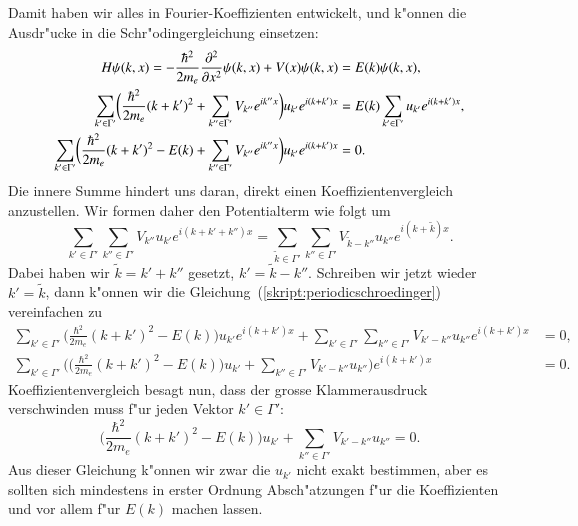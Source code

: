 Damit haben wir alles in Fourier-Koeffizienten entwickelt, und k"onnen die
Ausdr"ucke in die Schr"odingergleichung einsetzen:
\begin{align}
H\psi(k,x)
=
-\frac{\hbar^2}{2m_e}\frac{\partial^2}{\partial x^2} \psi(k,x)
+V(x)\psi(k,x)
&=E(k)\psi(k,x),
\notag
\\
\sum_{k'\in\Gamma'}\biggl(
\frac{\hbar^2}{2m_e}(k+k')^2
+
\sum_{k''\in\Gamma'}V_{k''}e^{ik''x}
\biggr)u_{k'}e^{i(k+k')x}
&=
E(k)\sum_{k'\in\Gamma'} u_{k'}e^{i(k+k')x},
\notag
\\
\sum_{k'\in\Gamma'}\biggl(
\frac{\hbar^2}{2m_e}(k+k')^2
-E(k)
+
\sum_{k''\in\Gamma'}V_{k''}e^{ik''x}
\biggr)u_{k'}e^{i(k+k')x}
&=
0.
\label{skript:periodicschroedinger}
\end{align}
Die innere Summe hindert uns daran, direkt einen Koeffizientenvergleich
anzustellen.
Wir formen daher den Potentialterm wie folgt um
\begin{equation*}
\sum_{k'\in\Gamma'}
\sum_{k''\in\Gamma'}V_{k''}u_{k'}e^{i(k+k'+k'')x}
=
\sum_{\tilde k\in\Gamma'}
\sum_{k''\in\Gamma'}V_{\tilde k-k''}u_{k''}e^{i(k+\tilde k)x}.
\end{equation*}
Dabei haben wir $\tilde k=k'+k''$ gesetzt, $k'=\tilde k-k''$.
Schreiben wir jetzt wieder $k'=\tilde k$, dann k"onnen wir die
Gleichung~(\ref{skript:periodicschroedinger}) vereinfachen zu
\begin{align*}
\sum_{k'\in\Gamma'}\biggl(
\frac{\hbar^2}{2m_e}(k+k')^2
-E(k)
\biggr)u_{k'}e^{i(k+k')x}
+
\sum_{k'\in\Gamma'}\sum_{k''\in\Gamma'}V_{k'-k''}u_{k''}e^{i(k+k')x}
&=
0,
\\
\sum_{k'\in\Gamma'}\biggl(
\biggl(
\frac{\hbar^2}{2m_e}(k+k')^2
-E(k)
\biggr)u_{k'}
+
\sum_{k''\in\Gamma'}V_{k'-k''}u_{k''}
\biggl)
e^{i(k+k')x}
&=
0.
\end{align*}
Koeffizientenvergleich besagt nun, dass der grosse Klammerausdruck
verschwinden muss f"ur jeden Vektor $k'\in\Gamma'$:
\begin{equation}
\biggl(
\frac{\hbar^2}{2m_e}(k+k')^2
-E(k)
\biggr)u_{k'}
+
\sum_{k''\in\Gamma'}V_{k'-k''}u_{k''}
=
0.
\label{skript:ukgleichung}
\end{equation}
Aus dieser Gleichung k"onnen wir zwar die $u_{k'}$ nicht exakt
bestimmen, aber es sollten sich mindestens in erster Ordnung
Absch"atzungen f"ur die Koeffizienten und vor allem f"ur $E(k)$
machen lassen.

